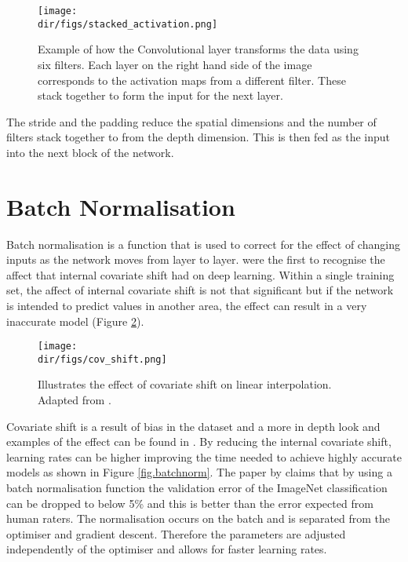 \begin{figure}[htbp]
    \centering
    \texttt{[image: \\dir/figs/stacked\_activation.png]}
    \caption[Example of how the Convolutional layer transforms the data using six filters]{Example of how the Convolutional layer transforms the data using six filters. Each layer on the right hand side of the image corresponds to the activation maps from a different filter. These stack together to form the input for the next layer.}
    \label{fig.conv_filter}
\end{figure}

The stride and the padding reduce the spatial dimensions and the number of filters stack together to from the depth dimension. This is then fed as the input into the next block of the network.

\section{Batch Normalisation}
Batch normalisation is a function that is used to correct for the effect of changing inputs as the network moves from layer to layer. \citet{ioffe15} were the first to recognise the affect that internal covariate shift had on deep learning. Within a single training set, the affect of internal covariate shift is not that significant but if the network is intended to predict values in another area, the effect can result in a very inaccurate model (Figure \ref{fig.cov_shift}). 
\begin{figure}[htbp]
    \centering
    \texttt{[image: \\dir/figs/cov\_shift.png]}
    \caption[The effect of Covariate shift on a linear extrapolation]{Illustrates the effect of covariate shift on linear interpolation. Adapted from \cite{sugiyama08}.}
    \label{fig.cov_shift}
\end{figure}
Covariate shift is a result of bias in the dataset and a more in depth look and examples of the effect can be found in \citet{smola11}. By reducing the internal covariate shift, learning rates can be higher improving the time needed to achieve highly accurate models as shown in Figure \ref{fig.batchnorm}. The paper by \citet{ioffe15} claims that by using a batch normalisation function the validation error of the ImageNet classification can be dropped to below 5\% and this is better than the error expected from human raters. The normalisation occurs on the batch and is separated from the optimiser and gradient descent. Therefore the parameters are adjusted independently of the optimiser and allows for faster learning rates. \par

